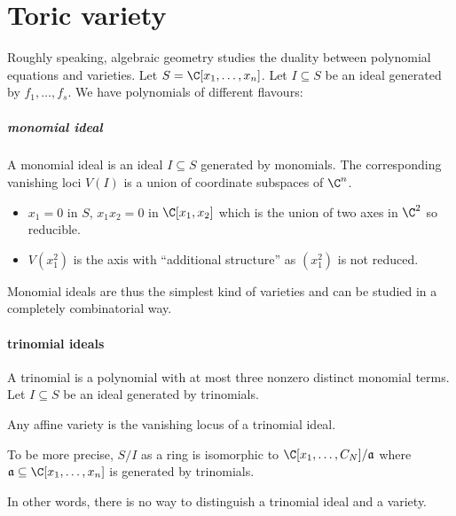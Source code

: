 \documentclass[a4paper]{article}
\begin{document}


\tableofcontents

\section{Toric variety}

Roughly speaking, algebraic geometry studies the duality between polynomial equations and varieties. Let \(S = \C[x_1, \dots, x_n]\). Let \(I \subseteq S\) be an ideal generated by \(f_1, \dots, f_s\). We have polynomials of different flavours:

\subparagraph{monomial ideal}

A monomial ideal is an ideal \(I \subseteq S\) generated by monomials. The corresponding vanishing loci \(V(I)\) is a union of coordinate subspaces of \(\C^n\).

\begin{eg}\leavevmode
  \begin{itemize}
  \item \(x_1 = 0\) in \(S\), \(x_1x_2 = 0\) in \(\C[x_1, x_2]\) which is the union of two axes in \(\C^2\) so reducible.
  \item \(V(x_1^2)\) is the axis with ``additional structure'' as \((x_1^2)\) is not reduced.
  \end{itemize}
\end{eg}

Monomial ideals are thus the simplest kind of varieties and can be studied in a completely combinatorial way.

\paragraph{trinomial ideals}

A trinomial is a polynomial with at most three nonzero distinct monomial terms. Let \(I \subseteq S\) be an ideal generated by trinomials.

\begin{lemma}
  Any affine variety is the vanishing locus of a trinomial ideal.
\end{lemma}

\begin{remark}
  To be more precise, \(S/I\) as a ring is isomorphic to \(\C[x_1, \dots, C_N]/\mathfrak a\) where \(\mathfrak a \subseteq \C[x_1, \dots, x_n]\) is generated by trinomials.
\end{remark}

In other words, there is no way to distinguish a trinomial ideal and a variety.
\end{document}
